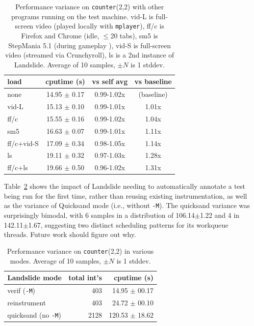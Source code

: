 \documentclass[10pt]{sigplanconf}
\begin{document}
\begin{table}[h]
	\begin{center}
	\begin{tabular}{l|c|c|c}
		load & cputime (s) & vs self avg & vs baseline \\
		\hline
		{\sf none	} & 14.95 $\pm$ 0.17	& 0.99-1.02x	& (baseline)	\\
		{\sf vid-L	} & 15.13 $\pm$ 0.10	& 0.99-1.01x	& 1.01x	\\
		{\sf ff/c	} & 15.55 $\pm$ 0.16	& 0.99-1.02x	& 1.04x	\\
		{\sf sm5	} & 16.63 $\pm$ 0.07	& 0.99-1.01x	& 1.11x \\
		{\sf ff/c+vid-S	} & 17.09 $\pm$ 0.34	& 0.98-1.05x	& 1.14x	\\
		{\sf ls		} & 19.11 $\pm$ 0.32	& 0.97-1.03x	& 1.28x	\\
		{\sf ff/c+ls	} & 19.66 $\pm$ 0.50	& 0.96-1.02x	& 1.31x	\\
	\end{tabular}
	\end{center}
	\caption{Performance variance on {\tt counter}(2,2) with other programs running on the test machine.
		{\sf vid-L} is full-screen video (played locally with {\tt mplayer}),
		{\sf ff/c} is Firefox and Chrome (idle, $\le$20 tabs),
		{\sf sm5} is StepMania 5.1 (during gameplay \cite{itg2}),
		{\sf vid-S} is full-screen video (streamed via Crunchyroll),
		{\sf ls} is a 2nd instance of Landslide.
		Average of 10 samples, $\pm N$ is 1 stddev.
	}
	\label{tab:variants}
\end{table}

Table~\ref{tab:variants2} shows
the impact of Landslide needing to automatically annotate a test being run for the first time,
rather than reusing existing instrumentation,
as well as the variance of Quicksand mode (i.e., without {\tt -M}).
The {\sf quicksand} variance was surprisingly bimodal,
with 6 samples in a distribution of 106.14$\pm$1.22 and 4 in 142.11$\pm$1.67,
suggesting two distinct scheduling patterns for its workqueue threads.
Future work should figure out why.

\begin{table}[h]
	\begin{center}
	\begin{tabular}{l|r|r}
		Landslide mode & total int's & cputime (s) \\
		\hline
		{\sf verif} ({\tt -M})		& 403 & 14.95 $\pm$ 00.17	\\
		{\sf reinstrument}		& 403 & 24.72 $\pm$ 00.10	\\
		{\sf quicksand} (no {\tt -M})	& 2128 & 120.53 $\pm$ 18.62	\\
	\end{tabular}
	\end{center}
	\caption{Performance variance on {\tt counter}(2,2) in various modes.
		Average of 10 samples, $\pm N$ is 1 stddev.
	}
	\label{tab:variants2}
\end{table}
\end{document}
